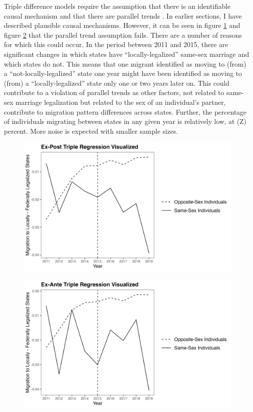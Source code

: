 \documentclass[12pt,letterpaper]{article}
\begin{document}
Triple difference models require the assumption that there is an identifiable causal mechanism and that there are parallel trends \citep{24, 25}. In earlier sections, I have described plausible causal mechanisms. However, it can be seen in figure \ref{fig: post_diffs} and figure \ref{fig: ante_diffs} that the parallel trend assumption fails. There are a number of reasons for which this could occur. In the period between 2011 and 2015, there are significant changes in which states have “locally-legalized” same-sex marriage and which states do not. This means that one migrant identified as moving to (from) a “not-locally-legalized” state one year might have been identified as moving to (from) a “locally-legalized” state only one or two years later on. This could contribute to a violation of parallel trends as other factors, not related to same-sex marriage legalization but related to the sex of an individual’s partner, contribute to migration pattern differences across states. Further, the percentage of individuals migrating between states in any given year is relatively low, at (Z) percent. More noise is expected with smaller sample sizes. 

\begin{centering} %
\begin{figure}
    \includegraphics[width=0.75\linewidth]{outputs/summary_stats/post_diffs.png}
    \caption{}
    \label{fig: post_diffs}
\end{figure}

\begin{figure}
    \centering
    \includegraphics[width=0.75\linewidth]{outputs/summary_stats/ante_diffs.png}
    \caption{}
    \label{fig: ante_diffs}
\end{figure}
\end{centering}
\end{document}
